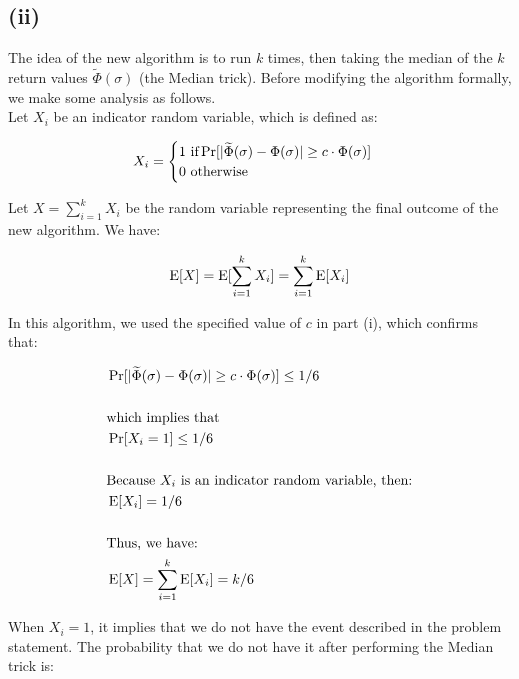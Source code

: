 \subsection*{(ii)}

The idea of the new algorithm is to run \alg $k$ times, then taking the median of the $k$ return values $\widetilde{\Phi}(\sigma)$ (the Median trick). Before modifying the algorithm formally, we make some analysis as follows. \\

Let $X_i$ be an indicator random variable, which is defined as:

\[ 
  X_i = \begin{cases}
    1 \text{	if} \Pr[|\widetilde{\Phi}(\sigma)- \Phi(\sigma)| \geq c\cdot \Phi(\sigma)] \\
    0 \text{	otherwise}
  \end{cases}
\]

Let $X = \sum_{i=1}^k X_i$ be the random variable representing the final outcome of the new algorithm. We have:

\begin{equation*}
  \operatorname{E}[X] = \operatorname{E}[\sum_{i=1}^k X_i] = \sum_{i=1}^k \operatorname{E}[X_i]
\end{equation*}

In this algorithm, we used the specified value of $c$ in part (i), which confirms that:

\begin{equation*}
  \begin{aligned}
&\Pr[|\widetilde{\Phi}(\sigma)- \Phi(\sigma)| \geq c\cdot \Phi(\sigma)] \leq 1/6 \\ \\
&\text{which implies that} \\ 
&\Pr[X_i = 1] \leq 1/6 \\ \\
&\text{Because $X_i$ is an indicator random variable, then:}\\
&\operatorname{E}[X_i] = 1/6 \\ \\
&\text{Thus, we have:} \\
&\operatorname{E}[X] = \sum_{i=1}^k \operatorname{E}[X_i] = k / 6 \\
\end{aligned}
\end{equation*}

When $X_i = 1$, it implies that we do not have the event described in the problem statement. The probability that we do not have it after performing the Median trick is:

